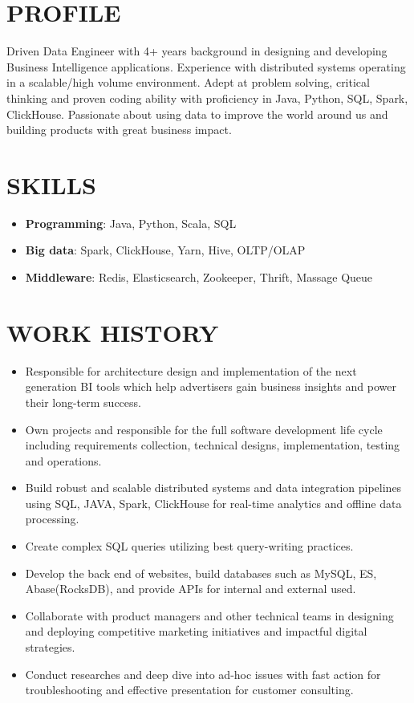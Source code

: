 \documentclass{resume}
\begin{document}

 
\section{PROFILE}
Driven Data Engineer with 4+ years background in designing and developing Business Intelligence applications.
Experience with distributed systems operating in a scalable/high volume environment.
Adept at problem solving, critical thinking and proven coding ability with proficiency in Java, Python, SQL, Spark, ClickHouse.
Passionate about using data to improve the world around us and building products with great business impact.

\section{SKILLS}
\begin{itemize}[parsep=0.2ex]
  \item \textbf{Programming}: Java, Python, Scala, SQL
  \item \textbf{Big data}: Spark, ClickHouse, Yarn, Hive, OLTP/OLAP
  \item \textbf{Middleware}: Redis, Elasticsearch, Zookeeper, Thrift, Massage Queue
\end{itemize}

\section{WORK HISTORY}
\begin{itemize}
  \item Responsible for architecture design and implementation of the next generation BI tools 
  which help advertisers gain business insights and power their long-term success.
  \item Own projects and responsible for the full software development life cycle 
  including requirements collection, technical designs, implementation, testing and operations.
  \item Build robust and scalable distributed systems and data integration pipelines 
  using SQL, JAVA, Spark, ClickHouse for real-time analytics and offline data processing. 
  \item Create complex SQL queries utilizing best query-writing practices.
  \item Develop the back end of websites, build databases such as MySQL, ES, Abase(RocksDB), and provide APIs for internal and external used.
  \item Collaborate with product managers and other technical teams in designing and deploying competitive marketing initiatives and impactful digital strategies.
  \item Conduct researches and deep dive into ad-hoc issues with fast action for troubleshooting and effective presentation for customer consulting.
  
\end{itemize}
\end{document}
